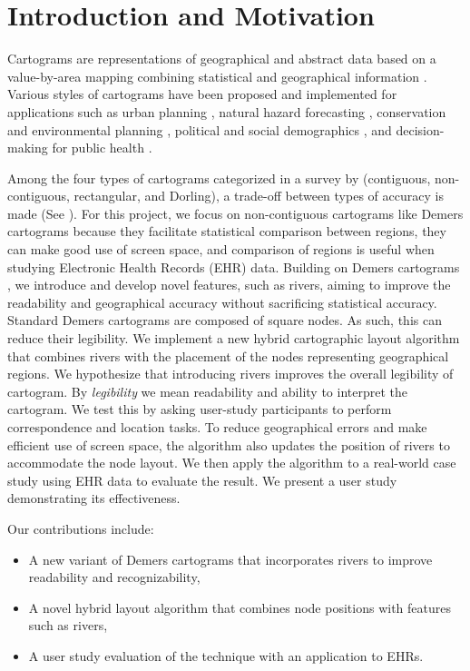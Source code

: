 \section{Introduction and Motivation}

Cartograms are representations of geographical and abstract data based on a value-by-area mapping combining statistical and geographical information \cite{dent2009Cartography}. Various styles of cartograms have been proposed and implemented for applications such as urban planning \cite{harris2018Mapping, arranz-lopez2021Enduser}, natural hazard forecasting \cite{pappenberger2019Cartograms, park2020Flood}, conservation and environmental planning \cite{galluzzi2018Mapping, rocchini2019Cartogramming}, political and social demographics \cite{breitzman2018Using, alieva2021How}, and decision-making for public health \cite{gao2020Visualising, sack2021Visualizing}.

Among the four types of cartograms categorized in a survey by  (contiguous, non-contiguous, rectangular, and Dorling), a trade-off between types of accuracy is made (See ).
For this project, we focus on non-contiguous cartograms like Demers cartograms because they facilitate statistical comparison between regions, they can make good use of screen space, and comparison of regions is useful when studying Electronic Health Records (EHR) data. Building on Demers cartograms \cite{ian2002Cartogram}, we introduce and develop novel features, such as rivers, aiming to improve the readability and geographical accuracy without sacrificing statistical accuracy.
Standard Demers cartograms are composed of square nodes. As such, this can reduce their legibility.
We implement a new hybrid cartographic layout algorithm that combines rivers with the placement of the nodes representing geographical regions. 
We hypothesize that introducing rivers improves the overall legibility of cartogram. 
By \textit{legibility} we mean readability and ability to interpret the cartogram.  
We test this by asking user-study participants to perform correspondence and location tasks.
To reduce geographical errors and make efficient use of screen space, the algorithm also updates the position of rivers to accommodate the node layout.
We then apply the algorithm to a real-world case study using EHR data to evaluate the result.
We present a user study demonstrating its effectiveness.

Our contributions include:

\begin{itemize}
    \item A new variant of Demers cartograms that incorporates rivers to improve readability and recognizability,
    \item A novel hybrid layout algorithm that combines node positions with features such as rivers,
    \item A user study evaluation of the technique with an application to EHRs.
\end{itemize}

